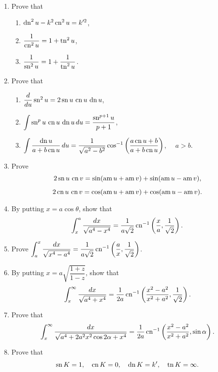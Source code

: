 \documentclass[11pt, a4paper]{article}
\begin{document}
\begin{enumerate}[leftmargin=2em]
\begin{enumerate}[label=(\alph*)]
\item $\dfrac{1-\cn u}{1+\cn u}=\left(\dfrac1{\sn u}-\dfrac{\cn u}{\sn u}\right)^2$.
\end{enumerate}

\item Prove that
\begin{enumerate}[label=(\arabic*)]
\item $\operatorname{dn}^2u-k^2\operatorname{cn}^2u=k'^2$,
\item $\dfrac1{\operatorname{cn}^2u}=1+\operatorname{tn}^2u$,
\item $\dfrac1{\operatorname{sn}^2u}=1+\dfrac1{\operatorname{tn}^2u}$.
\end{enumerate}

\item Prove that
\begin{enumerate}[label=(\arabic*)]
\item $\dfrac{d}{du}\operatorname{sn}^2u=2\operatorname{sn} u\,\operatorname{cn} u\,\operatorname{dn} u$,
\item $\displaystyle\int \operatorname{sn}^pu\,\operatorname{cn} u\,\operatorname{dn} u\,du=\dfrac{\operatorname{sn}^{p+1}u}{p+1}$,
\item $\displaystyle\int \dfrac{\operatorname{dn} u}{a+b\operatorname{cn} u}\,du=\dfrac1{\sqrt{a^2-b^2}}\cos^{-1}\left(\dfrac{a\operatorname{cn} u+b}{a+b\operatorname{cn} u}\right)$, $\quad a>b$.
\end{enumerate}

\item Prove
\[
2\operatorname{sn} u\,\operatorname{cn} v=\sin(\operatorname{am} u+\operatorname{am} v)+\sin(\operatorname{am} u-\operatorname{am} v),
\]
\[
2\operatorname{cn} u\,\operatorname{cn} v=\cos(\operatorname{am} u+\operatorname{am} v)+\cos(\operatorname{am} u-\operatorname{am} v).
\]

\item By putting $x=a\cos\theta$, show that
\[
\int_x^a\frac{dx}{\sqrt{a^4-x^4}}=\frac{1}{a\sqrt2}\operatorname{cn}^{-1}\left(\frac{x}{a},\frac{1}{\sqrt2}\right).
\]

\item Prove $\displaystyle\int_a^x\frac{dx}{\sqrt{x^4-a^4}}=\frac{1}{a\sqrt2}\operatorname{cn}^{-1}\left(\frac{a}{x},\frac{1}{\sqrt2}\right)$.

\item By putting $x=a\sqrt{\dfrac{1+z}{1-z}}$, show that
\[
\int_x^\infty\frac{dx}{\sqrt{a^4+x^4}}=\frac{1}{2a}\operatorname{cn}^{-1}\left(\frac{x^2-a^2}{x^2+a^2},\frac{1}{\sqrt2}\right).
\]

\item Prove that
\[
\int_x^\infty\frac{dx}{\sqrt{a^4+2a^2x^2\cos2\alpha+x^4}}=\frac{1}{2a}\operatorname{cn}^{-1}\left(\frac{x^2-a^2}{x^2+a^2},\sin\alpha\right).
\]

\item Prove that
\[
\operatorname{sn} K=1,\quad \operatorname{cn} K=0,\quad \operatorname{dn} K=k',\quad \operatorname{tn} K=\infty.
\]


\end{enumerate}
\end{document}
